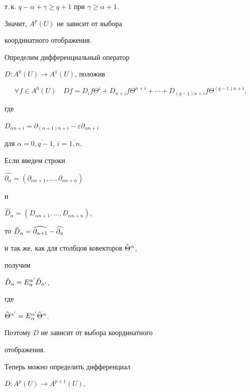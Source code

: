 т.\,к. $q-\alpha+\gamma \ge q + 1$ при $\gamma \ge \alpha + 1$.


Значит, $A^{p}(U)$ не зависит от выбора


координатного отображения.





Определим дифференциальный оператор


$D : A^0(U) \to A^1(U)$, положив


$$


\forall f \in A^0(U) \quad


D f = D_{i} f\Theta ^{i} + D_{n+i} f\Theta ^{n+i} + \dotsb +


D_{(q-1)n+i} f\Theta ^{(q-1)n+i},


$$


где


$D_{\alpha n + i} =


\partial_{(\alpha +1)n+i} - \varepsilon \partial_{\alpha n+i}$


для $\alpha =\overline{0,q-1}$, $i=\overline{1,n}$.





Если введем строки


$\widehat{\partial_\alpha} =


(\partial_{\alpha n + 1}, \dotsc, \partial_{\alpha n + n})$


и


$\widehat D_\alpha =


(D_{\alpha n + 1}, \dotsc, D_{\alpha n + n})$,


то $\Hat D_\alpha =


\widehat{\partial_{\alpha + 1}} -


\widehat{\partial_{\alpha}}$


и так же, как для столбцов ковекторов $\Hat\Theta^\alpha$,


получим


$\Hat D_{\alpha} = E^{\alpha'}_\alpha \Hat D_{\alpha'}$,


где


$\Hat\Theta^{\alpha'} = E_\alpha^{\alpha'}\Hat\Theta^\alpha$.


Поэтому $D$ не зависит от выбора координатного


отображения.





Теперь можно определить дифференциал


$D : A^{p}(U) \rightarrow A^{p+1}(U)$,


